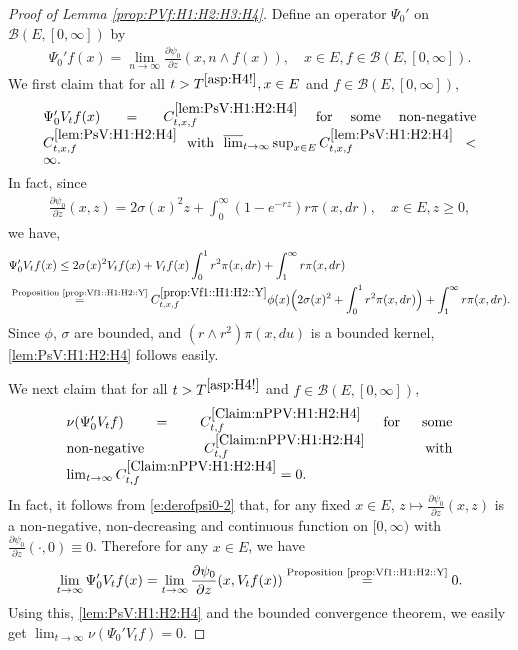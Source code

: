 \documentclass[12pt,a4paper]{amsart}
\numberwithin{equation}{section}
\theoremstyle{plain}
\theoremstyle{definition}
\theoremstyle{remark}
\begin{document}
\begin{proof}[Proof of Lemma \ref{prop:PVf:H1:H2:H3:H4}]
	Define an operator $\Psi_0'$ on $\mathcal B(E,[0,\infty])$ by
	\begin{align}
	\Psi_0' f(x)
	= \lim_{n\to \infty}\frac{\partial \psi_0}{ \partial z} (x, n\wedge f(x)),
	\quad x\in E, f\in \mathcal B(E,[0,\infty]).
	\end{align}
	We first claim that for all $t> T^{\eqref{asp:H4!}}, x\in E$ and $f\in \mathcal B(E,[0,\infty])$,
\begin{equation}
\begin{minipage}[c]{0.9\textwidth}
	$\Psi_0'V_tf(x) = C^{\eqref{lem:PsV:H1:H2:H4}}_{t,x,f}$ for some non-negative $C^{\eqref{lem:PsV:H1:H2:H4}}_{t,x,f}$ with $\varlimsup_{t\to \infty} \sup_{x\in E} C^{\eqref{lem:PsV:H1:H2:H4}}_{t,x,f} <\infty$.
\end{minipage} \label{lem:PsV:H1:H2:H4}
\end{equation}
	In fact, since
\begin{align}\label{e:derofpsi0-2}
	\frac{\partial \psi_0 }{ \partial z} (x,z)
	= 2\sigma (x)^2 z + \int_0^\infty (1 - e^{- rz}) r \pi(x,dr),
	\quad x\in E, z\geq 0,
\end{align}
	we have,
\begin{align}
	&\Psi_0' V_tf(x)
	\leq 2\sigma (x)^2 V_t f(x) + V_t f(x) \int_0^1 r^2 \pi(x,dr) + \int_1^\infty r \pi(x,dr)
	\\&\overset{\text{Proposition \ref{prop:Vf1::H1:H2::Y}}}= C^{\ref{prop:Vf1::H1:H2::Y}}_{t,x,f} \phi(x) \Big(2\sigma (x)^2 +\int_0^1 r^2 \pi(x,dr) \Big)+ \int_1^\infty r \pi(x,dr).
\end{align}
	Since $\phi$, $\sigma$ are bounded,  and $(r\wedge r^2)\pi(x,du)$ is a bounded kernel, \eqref{lem:PsV:H1:H2:H4} follows easily.
	
	We next claim that for all $t > T^{\eqref{asp:H4!}}$ and $f\in \mathcal B(E,[0,\infty])$,
\begin{equation}
\begin{minipage}{0.8\textwidth}
	$\nu(\Psi_0' V_t f) = C^{\eqref{Claim:nPPV:H1:H2:H4}}_{t,f}$ for some non-negative $C^{\eqref{Claim:nPPV:H1:H2:H4}}_{t,f}$ with $\lim_{t\to \infty} C^{\eqref{Claim:nPPV:H1:H2:H4}}_{t,f} = 0$.
\end{minipage} \label{Claim:nPPV:H1:H2:H4}
\end{equation}
	In fact, it follows from \eqref{e:derofpsi0-2} that, for any fixed $x\in E$, $z\mapsto \frac{\partial \psi_0}{\partial z} (x,z)$ is a non-negative, non-decreasing and continuous function on $[0,\infty)$ with $\frac{\partial \psi_0}{\partial z} (\cdot,0) \equiv 0$.
	Therefore for any $x\in E$, we have
\[
	\lim_{t\to \infty} \Psi_0' V_tf(x) =\lim_{t\to \infty} \frac{\partial \psi_0}{ \partial z}(x,V_tf(x)) \overset{\text{Proposition \ref{prop:Vf1::H1:H2::Y}}}{=} 0.
\]
	Using this, \eqref{lem:PsV:H1:H2:H4} and the bounded convergence theorem, we easily get  $\lim_{t\to \infty}\nu(\Psi_0' V_tf)  = 0. $


\end{proof}
\end{document}
